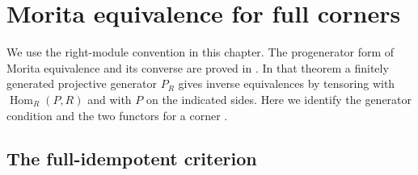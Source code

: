 \chapter{Morita equivalence for full corners}
\label{ch:rm03-morita}

We use the right-module convention in this chapter. The progenerator
form of Morita equivalence and its converse are proved in
\cite[Ch.~3, ALG-03-C02-S05]{p103}. In that theorem a finitely generated
projective generator \(P_R\) gives inverse equivalences by tensoring
with \(\operatorname{Hom}_R(P,R)\) and with \(P\) on the indicated
sides. Here we identify the generator condition and the two functors
for a corner
\cite[Lec.~7]{mitmorita}.

\section{The full-idempotent criterion}

